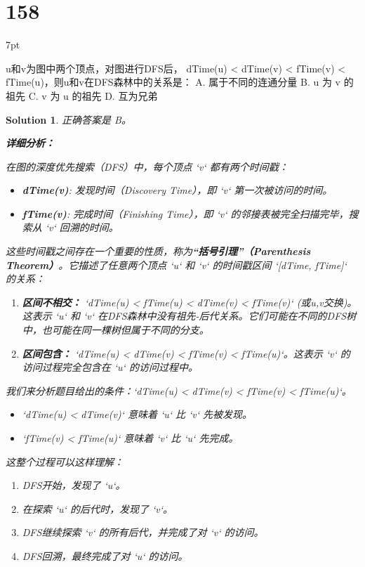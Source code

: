 \documentclass[UTF8]{report}
\newtheorem{solution}{Solution}
\theoremstyle{MyLineTheoremStyle} %
\theoremstyle{MyBlockTheoremStyle} %
\theoremstyle{MySubsubsectionStyle} %
\newenvironment{graybox}{%
        \def\FrameCommand{%
        \hspace{1pt}%
        {\color{gray}\small \vrule width 2pt}%
        {\color{graybox_color}\vrule width 4pt}%
        \colorbox{graybox_color}%
        }%
        \MakeFramed{\advance\hsize-\width\FrameRestore}%
        \noindent\hspace{-4.55pt}%
        \begin{adjustwidth}{}{7pt}%
        \vspace{2pt}\vspace{2pt}%
        }
        {%
        \vspace{2pt}\end{adjustwidth}\endMakeFramed%
        }
\begin{document}
\section*{158}
\begin{graybox}
u和v为图中两个顶点，对图进行DFS后，
dTime(u) < dTime(v) < fTime(v) <
fTime(u)，则u和v在DFS森林中的关系是：
A. 属于不同的连通分量
B. u 为 v 的祖先
C. v 为 u 的祖先
D. 互为兄弟
\end{graybox}

\begin{solution}
正确答案是 B。

\textbf{详细分析：}

在图的深度优先搜索（DFS）中，每个顶点 `v` 都有两个时间戳：
\begin{itemize}
    \item \textbf{dTime(v)}: 发现时间（Discovery Time），即 `v` 第一次被访问的时间。
    \item \textbf{fTime(v)}: 完成时间（Finishing Time），即 `v` 的邻接表被完全扫描完毕，搜索从 `v` 回溯的时间。
\end{itemize}

这些时间戳之间存在一个重要的性质，称为\textbf{“括号引理”（Parenthesis Theorem）}。它描述了任意两个顶点 `u` 和 `v` 的时间戳区间 `[dTime, fTime]` 的关系：

\begin{enumerate}
    \item \textbf{区间不相交：} `dTime(u) < fTime(u) < dTime(v) < fTime(v)` (或u,v交换)。这表示 `u` 和 `v` 在DFS森林中没有祖先-后代关系。它们可能在不同的DFS树中，也可能在同一棵树但属于不同的分支。
    \item \textbf{区间包含：} `dTime(u) < dTime(v) < fTime(v) < fTime(u)`。这表示 `v` 的访问过程完全包含在 `u` 的访问过程中。
\end{enumerate}

我们来分析题目给出的条件：`dTime(u) < dTime(v) < fTime(v) < fTime(u)`。

\begin{itemize}
    \item `dTime(u) < dTime(v)` 意味着 `u` 比 `v` 先被发现。
    \item `fTime(v) < fTime(u)` 意味着 `v` 比 `u` 先完成。
\end{itemize}

这整个过程可以这样理解：
\begin{enumerate}
    \item DFS开始，发现了 `u`。
    \item 在探索 `u` 的后代时，发现了 `v`。
    \item DFS继续探索 `v` 的所有后代，并完成了对 `v` 的访问。
    \item DFS回溯，最终完成了对 `u` 的访问。
\end{enumerate}


\end{solution}
\end{document}
